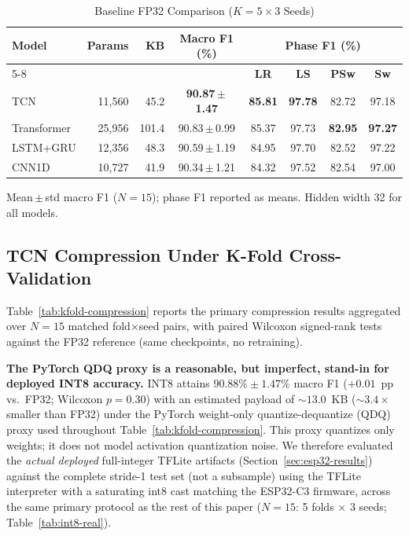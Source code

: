 \documentclass[conference]{IEEEtran}
\renewcommand{\arraystretch}{1.15}
\begin{document}
\begin{table}[!t]
  \centering
  \caption{Baseline FP32 Comparison ($K{=}5\times3$ Seeds)}
  \label{tab:baseline}
  \scriptsize
  \setlength{\tabcolsep}{2.8pt}
  \renewcommand{\arraystretch}{1.1}
  \begin{tabular}{@{} l r r c *{4}{c} @{}}
    \toprule
    \textbf{Model} & \textbf{Params} & \textbf{KB} & \textbf{Macro F1 (\%)} &
    \multicolumn{4}{c}{\textbf{Phase F1 (\%)}} \\
    \cmidrule(lr){5-8}
    & & & & \textbf{LR} & \textbf{LS} & \textbf{PSw} & \textbf{Sw} \\
    \midrule
    TCN &
      11{,}560 & 45.2 & \textbf{90.87\,$\pm$\,1.47} &
      \textbf{85.81} & \textbf{97.78} & 82.72 & 97.18 \\
    Transformer &
      25{,}956 & 101.4 & 90.83\,$\pm$\,0.99 &
      85.37 & 97.73 & \textbf{82.95} & \textbf{97.27} \\
    LSTM+GRU &
      12{,}356 & 48.3 & 90.59\,$\pm$\,1.19 &
      84.95 & 97.70 & 82.52 & 97.22 \\
    CNN1D &
      10{,}727 & 41.9 & 90.34\,$\pm$\,1.21 &
      84.32 & 97.52 & 82.54 & 97.00 \\
    \bottomrule
  \end{tabular}

  \vspace{0.45em}
  {\scriptsize Mean\,$\pm$\,std macro F1 ($N{=}15$); phase F1 reported as means. Hidden width 32 for all models.}
\end{table}

\subsection{TCN Compression Under K-Fold Cross-Validation}

Table~\ref{tab:kfold-compression} reports the primary compression results aggregated over
$N{=}15$ matched fold$\times$seed pairs, with paired Wilcoxon signed-rank tests against the FP32
reference (same checkpoints, no retraining).



\textbf{The PyTorch QDQ proxy is a reasonable, but imperfect, stand-in for deployed INT8 accuracy.}
INT8 attains $90.88\%\pm1.47\%$ macro F1 ($+0.01$~pp vs.\ FP32; Wilcoxon $p{=}0.30$) with an
estimated payload of ${\sim}13.0$~KB (${\sim}3.4{\times}$ smaller than FP32) under the PyTorch
weight-only quantize-dequantize (QDQ) proxy used throughout Table~\ref{tab:kfold-compression}.
This proxy quantizes only weights; it does not model activation quantization noise. We therefore
evaluated the \emph{actual deployed} full-integer TFLite artifacts (Section~\ref{sec:esp32-results})
against the complete stride-1 test set (not a subsample) using the TFLite interpreter with a
saturating int8 cast matching the ESP32-C3 firmware, across the same primary protocol as the rest
of this paper ($N{=}15$: 5 folds $\times$ 3 seeds; Table~\ref{tab:int8-real}).
\end{document}
